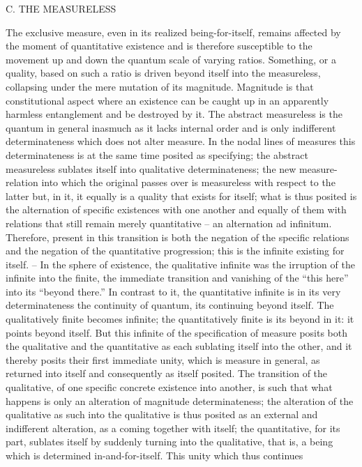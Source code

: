 C. THE MEASURELESS

The exclusive measure, even in its realized being-for-itself, remains affected
by the moment of quantitative existence and is therefore susceptible to the
movement up and down the quantum scale of varying ratios. Something,
or a quality, based on such a ratio is driven beyond itself into the measureless,
collapsing under the mere mutation of its magnitude. Magnitude is that
constitutional aspect where an existence can be caught up in an apparently
harmless entanglement and be destroyed by it.
The abstract measureless is the quantum in general inasmuch as it lacks
internal order and is only indifferent determinateness which does not alter
measure. In the nodal lines of measures this determinateness is at the
same time posited as specifying; the abstract measureless sublates itself
into qualitative determinateness; the new measure-relation into which the
original passes over is measureless with respect to the latter but, in it,
it equally is a quality that exists for itself; what is thus posited is the
alternation of specific existences with one another and equally of them
with relations that still remain merely quantitative – an alternation ad
infinitum. Therefore, present in this transition is both the negation of the
specific relations and the negation of the quantitative progression; this is the
infinite existing for itself. – In the sphere of existence, the qualitative infinite
was the irruption of the infinite into the finite, the immediate transition
and vanishing of the “this here” into its “beyond there.” In contrast to
it, the quantitative infinite is in its very determinateness the continuity
of quantum, its continuing beyond itself. The qualitatively finite becomes
infinite; the quantitatively finite is its beyond in it: it points beyond itself. But
this infinite of the specification of measure posits both the qualitative and the
quantitative as each sublating itself into the other, and it thereby posits their
first immediate unity, which is measure in general, as returned into itself
and consequently as itself posited. The transition of the qualitative, of one
specific concrete existence into another, is such that what happens is only
an alteration of magnitude determinateness; the alteration of the qualitative
as such into the qualitative is thus posited as an external and indifferent
alteration, as a coming together with itself; the quantitative, for its part,
sublates itself by suddenly turning into the qualitative, that is, a being
which is determined in-and-for-itself. This unity which thus continues
